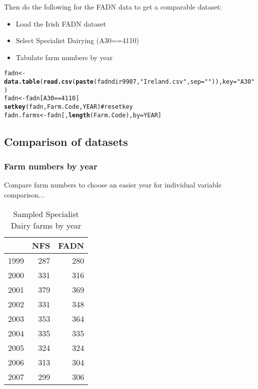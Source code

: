 \documentclass{article}\usepackage{graphicx, color}
\makeatletter
\newcommand{\hlfunctioncall}[1]{\textcolor[rgb]{0.501960784313725,0,0.329411764705882}{\textbf{#1}}}%
\newcommand{\hlstring}[1]{\textcolor[rgb]{0.6,0.6,1}{#1}}%
\newcommand{\hlcomment}[1]{\textcolor[rgb]{0.180392156862745,0.6,0.341176470588235}{#1}}%
\newenvironment{kframe}{%
 \def\at@end@of@kframe{}%
 \ifinner\ifhmode%
  \def\at@end@of@kframe{\end{minipage}}%
  \begin{minipage}{\columnwidth}%
 \fi\fi%
 \def\FrameCommand##1{\hskip\@totalleftmargin \hskip-\fboxsep
 \colorbox{shadecolor}{##1}\hskip-\fboxsep
     \hskip-\linewidth \hskip-\@totalleftmargin \hskip\columnwidth}%
 \MakeFramed {\advance\hsize-\width
   \@totalleftmargin\z@ \linewidth\hsize
   \@setminipage}}%
 {\par\unskip\endMakeFramed%
 \at@end@of@kframe}
\newenvironment{knitrout}{}{} %
\makeatother
\begin{document}
\begin{flushleft}
Then do the following for the FADN data to get a comparable dataset: 
\begin{itemize}
  \item{Load the Irish FADN dataset}
  \item{Select Specialist Dairying (A30==4110)}
  \item{Tabulate farm numbers by year}
\end{itemize}
\begin{knitrout}
\color{fgcolor}\begin{kframe}
\begin{alltt}
fadn <- \hlfunctioncall{data.table}(\hlfunctioncall{read.csv}(\hlfunctioncall{paste}(fadndir9907, \hlstring{"Ireland.csv"}, sep = \hlstring{""})), key = \hlstring{"A30"})
fadn <- fadn[A30 == 4110]
\hlfunctioncall{setkey}(fadn, Farm.Code, YEAR)  \hlcomment{# reset key}
fadn.farms <- fadn[, \hlfunctioncall{length}(Farm.Code), by = YEAR]
\end{alltt}
\end{kframe}
\end{knitrout}


\subsection*{Comparison of datasets}
\subsubsection*{Farm numbers by year}
Compare farm numbers to choose an easier year for individual variable comparison... 

\begin{table}[ht]
\begin{center}
\begin{tabular}{rrr}
  \hline
 & NFS & FADN \\ 
  \hline
1999 & 287 & 280 \\ 
  2000 & 331 & 316 \\ 
  2001 & 379 & 369 \\ 
  2002 & 331 & 348 \\ 
  2003 & 353 & 364 \\ 
  2004 & 335 & 335 \\ 
  2005 & 324 & 324 \\ 
  2006 & 313 & 304 \\ 
  2007 & 299 & 306 \\ 
   \hline
\end{tabular}
\caption{Sampled Specialist Dairy farms by year}
\end{center}
\end{table}




\end{flushleft}
\end{document}

